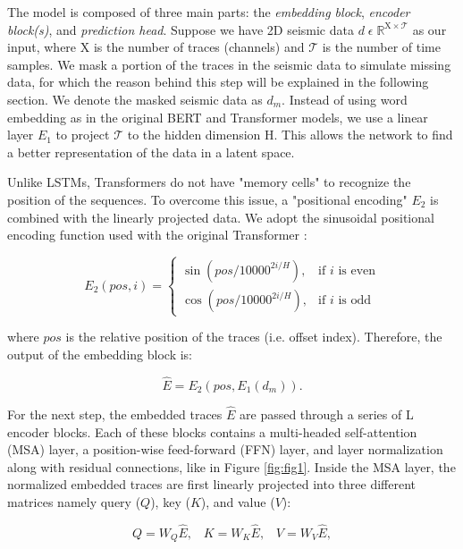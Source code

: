 \documentclass{article}
\newcommand\Tau{\mathcal{T}}
\begin{document}
The model is composed of three main parts: the \textit{embedding block}, \textit{encoder block(s)}, and \textit{prediction head}. Suppose we have 2D seismic data $d\;\epsilon\;\mathbb{R}^{\mathrm{X} \times \mathrm{\Tau}}$ as our input, where $\mathrm{X}$ is the number of traces (channels) and $\Tau$ is the number of time samples. We mask a portion of the traces in the seismic data to simulate missing data, for which the reason behind this step will be explained in the following section. We denote the masked seismic data as $d_m$. Instead of using word embedding as in the original BERT and Transformer models, we use a linear layer $E_1$ to project $\Tau$ to the hidden dimension H. This allows the network to find a better representation of the data in a latent space.

Unlike LSTMs, Transformers do not have "memory cells" to recognize the position of the sequences. To overcome this issue, a "positional encoding" $E_2$ is combined with the linearly projected data. We adopt the sinusoidal positional encoding function used with the original Transformer \cite{vaswani2017attention}:

\begin{equation}
    \label{eq:eq1}
    E_2(pos, i) =
    \begin{cases}
        \sin(pos/10000^{2i/H}), & \text{if $i$ is even} \\
        \cos(pos/10000^{2i/H}), & \text{if $i$ is odd}
    \end{cases}
\end{equation}

where $pos$ is the relative position of the traces (i.e. offset index). Therefore, the output of the embedding block is:

\begin{equation}
    \label{eq:eq2}
  \hat{E} = E_2(pos, E_1(d_m)).  
\end{equation}

For the next step, the embedded traces $\hat{E}$ are passed through a series of L encoder blocks. Each of these blocks contains a multi-headed self-attention (MSA) layer, a position-wise feed-forward (FFN) layer, and layer normalization along with residual connections, like in Figure \ref{fig:fig1}. Inside the MSA layer, the normalized embedded traces are first linearly projected into three different matrices namely query ($Q$), key ($K$), and value ($V$):

\begin{equation}
    \label{eq:eq3}
    Q = W_Q\hat{E},\;\;\; K = W_K\hat{E},\;\;\;V = W_V\hat{E},
\end{equation}
\end{document}
